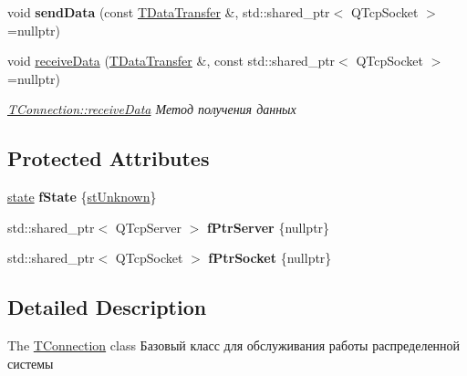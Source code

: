 \begin{DoxyCompactItemize}
\mbox{\label{classconnection_1_1_t_connection_acd87152af430e1b8e73f301ab087b1b8}} 
void {\bfseries send\+Data} (const \hyperlink{structconnection_1_1_t_data_transfer}{T\+Data\+Transfer} \&, std\+::shared\+\_\+ptr$<$ Q\+Tcp\+Socket $>$=nullptr)
\item 
void \hyperlink{classconnection_1_1_t_connection_aa55500363892831d9764496cd63cec73}{receive\+Data} (\hyperlink{structconnection_1_1_t_data_transfer}{T\+Data\+Transfer} \&, const std\+::shared\+\_\+ptr$<$ Q\+Tcp\+Socket $>$=nullptr)
\begin{DoxyCompactList}\small\item\em \hyperlink{classconnection_1_1_t_connection_aa55500363892831d9764496cd63cec73}{T\+Connection\+::receive\+Data} Метод получения данных \end{DoxyCompactList}\end{DoxyCompactItemize}
\subsection*{Protected Attributes}
\begin{DoxyCompactItemize}
\item 
\mbox{\label{classconnection_1_1_t_connection_aa55714bb2a9a2b9330b2fd81f7a47f17}} 
\hyperlink{classconnection_1_1_t_connection_aee7dfb7510592bd2697ab6f906b9612c}{state} {\bfseries f\+State} \{\hyperlink{classconnection_1_1_t_connection_aee7dfb7510592bd2697ab6f906b9612ca8ab66af10a4d089e45c493a28df001e4}{st\+Unknown}\}
\item 
\mbox{\label{classconnection_1_1_t_connection_aef0ac752e1f8b50fe31a01aff7ee802a}} 
std\+::shared\+\_\+ptr$<$ Q\+Tcp\+Server $>$ {\bfseries f\+Ptr\+Server} \{nullptr\}
\item 
\mbox{\label{classconnection_1_1_t_connection_a84981e0f089de2f0a0d2496f43fa09ac}} 
std\+::shared\+\_\+ptr$<$ Q\+Tcp\+Socket $>$ {\bfseries f\+Ptr\+Socket} \{nullptr\}
\end{DoxyCompactItemize}


\subsection{Detailed Description}
The \hyperlink{classconnection_1_1_t_connection}{T\+Connection} class Базовый класс для обслуживания работы распределенной системы 

